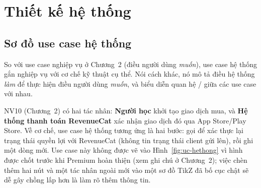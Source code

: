\chapter{Thiết kế hệ thống}

\section{Sơ đồ use case hệ thống}

So với use case nghiệp vụ ở Chương~2 (điều người dùng \textit{muốn}), use case hệ thống
gắn nghiệp vụ với cơ chế kỹ thuật cụ thể. Nói cách khác, nó mô tả điều hệ thống
\textit{làm} để thực hiện điều người dùng \textit{muốn}, và biểu diễn quan hệ
/ giữa các use case với nhau.

\begin{luuy}
NV10 (Chương~2) có hai tác nhân: \textbf{Người học} khởi tạo giao dịch mua, và \textbf{Hệ
thống thanh toán RevenueCat} xác nhận giao dịch đó qua App Store/Play Store. Về cơ chế,
use case hệ thống tương ứng là  hai bước: gọi  để xác
thực lại trạng thái quyền lợi với RevenueCat (không tin trạng thái client gửi lên), rồi ghi
một dòng  mới. Use case này không được vẽ vào Hình~\ref{fig:uc-hethong}
vì hình được chốt trước khi Premium hoàn thiện (xem ghi chú ở Chương~2); việc chèn thêm hai
nút và một tác nhân ngoài mới vào một sơ đồ TikZ đã bố cục chật sẽ dễ gây chồng lấp hơn là
làm rõ thêm thông tin.
\end{luuy}


